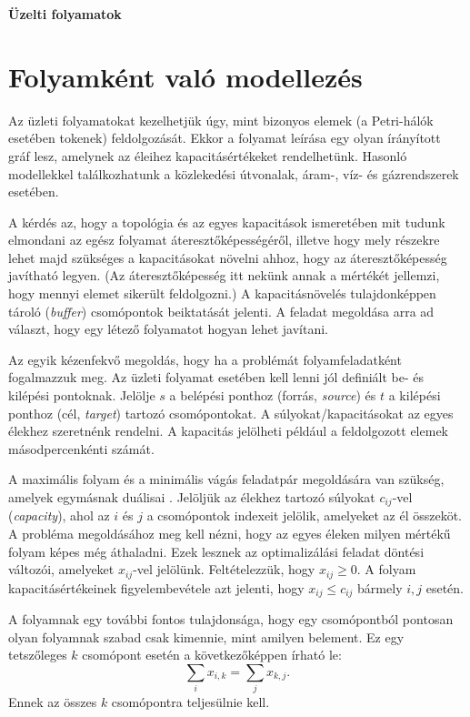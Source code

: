 \documentclass[a4paper]{article}
\begin{document}
\begin{center}
   \huge \textbf{Üzelti folyamatok}
\end{center}

\vskip 0.3cm

\section{Folyamként való modellezés}

Az üzleti folyamatokat kezelhetjük úgy, mint bizonyos elemek (a Petri-hálók esetében tokenek) feldolgozását.
Ekkor a folyamat leírása egy olyan írányított gráf lesz, amelynek az éleihez kapacitásértékeket rendelhetünk.
Hasonló modellekkel találkozhatunk a közlekedési útvonalak, áram-, víz- és gázrendszerek esetében.

A kérdés az, hogy a topológia és az egyes kapacitások ismeretében mit tudunk elmondani az egész folyamat áteresztőképességéről, illetve hogy mely részekre lehet majd szükséges a kapacitásokat növelni ahhoz, hogy az áteresztőképesség javítható legyen.
(Az áteresztőképesség itt nekünk annak a mértékét jellemzi, hogy mennyi elemet sikerült feldolgozni.)
A kapacitásnövelés tulajdonképpen tároló (\textit{buffer}) csomópontok beiktatását jelenti.
A feladat megoldása arra ad választ, hogy egy létező folyamatot hogyan lehet javítani.

Az egyik kézenfekvő megoldás, hogy ha a problémát folyamfeladatként fogalmazzuk meg.
Az üzleti folyamat esetében kell lenni jól definiált be- és kilépési pontoknak.
Jelölje $s$ a belépési ponthoz (forrás, \textit{source}) és $t$ a kilépési ponthoz (cél, \textit{target}) tartozó csomópontokat.
A súlyokat/kapacitásokat az egyes élekhez szeretnénk rendelni.
A kapacitás jelölheti például a feldolgozott elemek másodpercenkénti számát.

A maximális folyam és a minimális vágás feladatpár megoldására van szükség, amelyek egymásnak duálisai \cite{ford2009maximal}.
Jelöljük az élekhez tartozó súlyokat $c_{ij}$-vel (\textit{capacity}), ahol az $i$ és $j$ a csomópontok indexeit jelölik, amelyeket az él összeköt.
A probléma megoldásához meg kell nézni, hogy az egyes éleken milyen mértékű folyam képes még áthaladni.
Ezek lesznek az optimalizálási feladat döntési változói, amelyeket $x_{ij}$-vel jelölünk.
Feltételezzük, hogy $x_{ij} \geq 0$.
A folyam kapacitásértékeinek figyelembevétele azt jelenti, hogy $x_{ij} \leq c_{ij}$ bármely $i, j$ esetén.

A folyamnak egy további fontos tulajdonsága, hogy egy csomópontból pontosan olyan folyamnak szabad csak kimennie, mint amilyen belement.
Ez egy tetszőleges $k$ csomópont esetén a következőképpen írható le:
\[
\displaystyle
\sum_{i} x_{i, k} = \sum_{j} x_{k, j}.
\]
Ennek az összes $k$ csomópontra teljesülnie kell.
\end{document}
